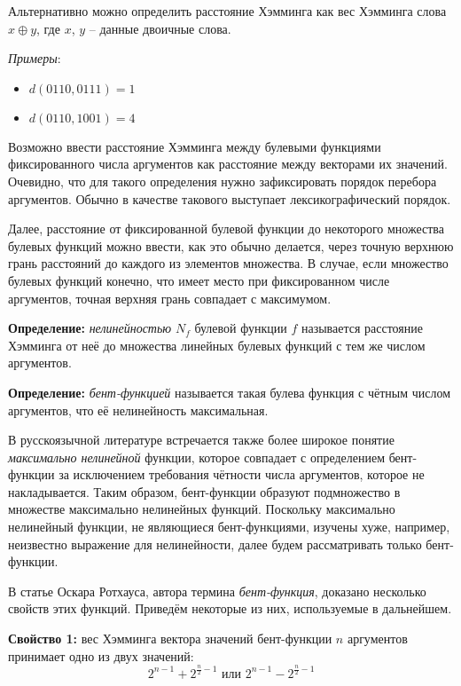 \documentclass[12pt, a4paper, reqno]{article}
\begin{document}
    Альтернативно можно определить расстояние Хэмминга как вес Хэмминга слова $x \oplus y$, где $x$,
    $y$ -- данные двоичные слова.

    \textit{Примеры}:
    \begin{itemize}
        \item $d(0110, 0111) = 1$
        \item $d(0110, 1001) = 4$
    \end{itemize}

    Возможно ввести расстояние Хэмминга между булевыми функциями фиксированного числа аргументов как
    расстояние между векторами их значений. Очевидно, что для такого определения нужно зафиксировать
    порядок перебора аргументов. Обычно в качестве такового выступает лексикографический порядок.

    Далее, расстояние от фиксированной булевой функции до некоторого множества булевых функций можно
    ввести, как это обычно делается, через точную верхнюю грань расстояний до каждого из элементов
    множества. В случае, если множество булевых функций конечно, что имеет место при фиксированном
    числе аргументов, точная верхняя грань совпадает с максимумом.

    \textbf{Определение:} \textit{нелинейностью} $N_f$ булевой функции $f$ называется расстояние
    Хэмминга от неё до множества линейных булевых функций с тем же числом аргументов.

    \textbf{Определение:} \textit{бент-функцией} называется такая булева функция с чётным числом
    аргументов, что её нелинейность максимальная.

    В русскоязычной литературе встречается также более широкое понятие \textit{максимально
    нелинейной} функции, которое совпадает с определением бент-функции за исключением требования
    чётности числа аргументов, которое не накладывается. Таким образом, бент-функции образуют
    подмножество в множестве максимально нелинейных функций. Поскольку максимально нелинейный
    функции, не являющиеся бент-функциями, изучены хуже, например, неизвестно выражение для
    нелинейности, далее будем рассматривать только бент-функции.

    В статье \cite{rothaus} Оскара Ротхауса, автора термина \textit{бент-функция}, доказано
    несколько свойств этих функций. Приведём некоторые из них, используемые в дальнейшем.

    \textbf{Свойство 1:} вес Хэмминга вектора значений бент-функции $n$ аргументов принимает одно из
    двух значений:
    \begin{equation*}
        2^{n - 1} + 2^{\frac{n}{2} - 1}\text{ или }2^{n - 1} - 2^{\frac{n}{2} - 1}
    \end{equation*}
\end{document}
